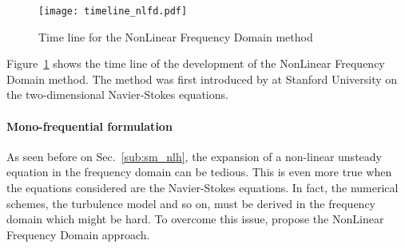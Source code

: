 
\begin{figure}[htbp]
  \centering
  \texttt{[image: timeline\_nlfd.pdf]}
  \caption{Time line for the NonLinear Frequency Domain method}
  \label{fig:timeline_nlfd}
\end{figure}
Figure~\ref{fig:timeline_nlfd} shows the time line of the
development of the NonLinear Frequency Domain method.
The method was first introduced by \citet{McMullen2001}
at Stanford University on the two-dimensional 
Navier-Stokes equations.

\paragraph{Mono-frequential formulation}

As seen before on Sec.~\ref{sub:sm_nlh}, the expansion of 
a non-linear unsteady equation in the frequency domain
can be tedious. This is even more true when the
equations considered are the Navier-Stokes equations. In
fact, the numerical schemes, the turbulence model and so
on, must be derived in the frequency domain which might be
hard. To overcome this issue, \citet{McMullen2001} propose
the NonLinear Frequency Domain approach.

